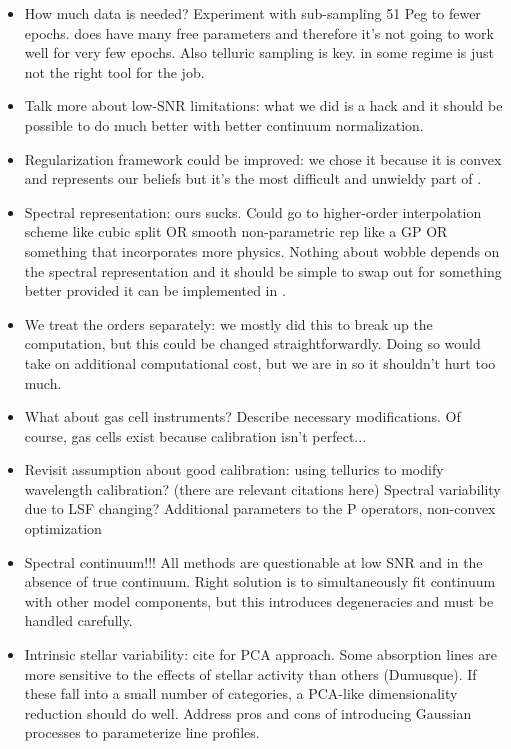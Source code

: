 \documentclass[modern]{aastex62}
\begin{document}
\begin{itemize}

\item How much data is needed? Experiment with sub-sampling 51 Peg to fewer epochs. \wobble does have many free parameters and therefore it's not going to work well for very few epochs. Also telluric sampling is key. in some regime \wobble is just not the right tool for the job.

\item Talk more about low-SNR limitations: what we did is a hack and it should be possible to do much better with better continuum normalization.

\item Regularization framework could be improved: we chose it because it is convex and represents our beliefs but it's the most difficult and unwieldy part of \wobble.

\item Spectral representation: ours sucks. Could go to higher-order interpolation scheme like cubic split OR smooth non-parametric rep like a GP OR something that incorporates more physics. Nothing about wobble depends on the spectral representation and it should be simple to swap out for something better provided it can be implemented in \TF.

\item We treat the orders separately: we mostly did this to break up the computation, but this could be changed straightforwardly. Doing so would take on additional computational cost, but we are in \TF so it shouldn't hurt too much.

\item What about gas cell instruments? Describe necessary modifications. Of course, gas cells exist because calibration isn't perfect...

\item Revisit assumption about good calibration: using tellurics to modify wavelength calibration? (there are relevant citations here) Spectral variability due to LSF changing? Additional parameters to the P operators, non-convex optimization

\item Spectral continuum!!! All methods are questionable at low SNR and in the absence of true continuum. Right solution is to simultaneously fit continuum with other model components, but this introduces degeneracies and must be handled carefully.

\item Intrinsic stellar variability: cite \citet{Davis2017} for PCA approach. Some absorption lines are more sensitive to the effects of stellar activity than others (Dumusque). If these fall into a small number of categories, a PCA-like dimensionality reduction should do well. Address pros and cons of introducing Gaussian processes to parameterize line profiles.


\end{itemize}
\end{document}
